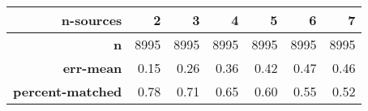 \begin{tabular}{rrrrrrr}
\toprule
\textbf{n-sources} &    2 &    3 &    4 &    5 &    6 &    7 \\
\midrule
\textbf{n              } & 8995 & 8995 & 8995 & 8995 & 8995 & 8995 \\
\textbf{err-mean       } & 0.15 & 0.26 & 0.36 & 0.42 & 0.47 & 0.46 \\
\textbf{percent-matched} & 0.78 & 0.71 & 0.65 & 0.60 & 0.55 & 0.52 \\
\bottomrule
\end{tabular}
